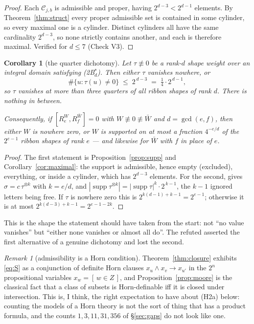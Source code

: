 \documentclass[11pt]{article}
\newtheorem{corollary}[theorem]{Corollary}
\theoremstyle{definition}
\theoremstyle{remark}
\newtheorem{remark}[theorem]{Remark}
\newcommand{\Cset}{\mathcal{C}}
\begin{document}
\begin{proof}
Each $\Cset_{j,b}$ is admissible \cite[Lemma 6.5]{Q150c1} and proper, having
$2^{d-3}<2^{d-1}$ elements.  By Theorem~\ref{thm:struct} every proper admissible set is contained
in some cylinder, so every maximal one is a cylinder.  Distinct cylinders all have the same
cardinality $2^{d-3}$, so none strictly contains another, and each is therefore maximal.
Verified for $d\le7$ (Check V3).
\end{proof}

\begin{corollary}[the quarter dichotomy]\label{cor:quarter}
Let $\tau\not\equiv0$ be a rank-$d$ shape weight over an integral domain satisfying
\textnormal{(2B$^*_d$)}.  Then \emph{either} $\tau$ vanishes nowhere, \emph{or}
\[
   \#\{u:\tau(u)\ne0\}\;\le\;2^{\,d-3}\;=\;\tfrac14\cdot2^{\,d-1},
\]
so $\tau$ vanishes at more than three quarters of all ribbon shapes of rank $d$.  There is
nothing in between.

Consequently, if $[R_e^{W},R_f^{\bar W}]=0$ with $W\not\equiv0\not\equiv\bar W$ and $d=\gcd(e,f)$,
then either $W$ is nowhere zero, or $W$ is supported on at most a fraction $4^{-e/d}$ of the
$2^{e-1}$ ribbon shapes of rank $e$ --- and likewise for $\bar W$ with $f$ in place of $e$.
\end{corollary}

\begin{proof}
The first statement is Proposition~\ref{prop:supp} and Corollary~\ref{cor:maximal}: the support
is admissible, hence empty (excluded), everything, or inside a cylinder, which has $2^{d-3}$
elements.  For the second, \cite[Thm.~1.3]{Q150c1} gives $\sigma=c\,\tau^{\otimes k}$ with
$k=e/d$, and $|\operatorname{supp}\tau^{\otimes k}|=|\operatorname{supp}\tau|^{k}\cdot2^{\,k-1}$,
the $k-1$ ignored letters being free.  If $\tau$ is nowhere zero this is
$2^{k(d-1)+k-1}=2^{e-1}$; otherwise it is at most $2^{k(d-3)+k-1}=2^{e-1-2k}$.
\end{proof}

This is the shape the statement should have taken from the start: not ``no value vanishes'' but
``either none vanishes or almost all do''.  The refuted \cite[Lemma 8.2]{Q149} asserted the first
alternative of a genuine dichotomy and lost the second.

\begin{remark}[admissibility is a Horn condition]\label{rem:horn}
Theorem~\ref{thm:closure} exhibits \eqref{eq:S} as a conjunction of definite Horn clauses
$x_u\wedge x_v\to x_{u'}$ in the $2^{n}$ propositional variables $x_w=[\,w\in Z\,]$, and
Proposition~\ref{prop:moore} is the classical fact that a class of subsets is Horn-definable iff
it is closed under intersection.  This is, I think, the right expectation to have about (H2a)
below: counting the models of a Horn theory is not the sort of thing that has a product formula,
and the counts $1,3,11,31,356$ of \S\ref{sec:gaps} do not look like one.
\end{remark}
\end{document}
